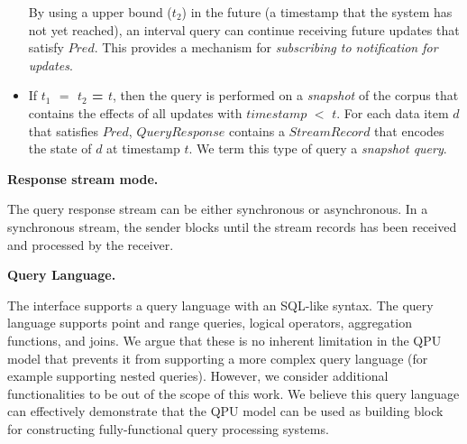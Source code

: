 \begin{itemize}
  By using a upper bound ($t_2$) in the future (a timestamp that the system has not yet reached),
  an interval query can continue receiving future updates that satisfy $Pred$.
  This provides a mechanism for \textit{subscribing to notification for updates}.

  \item If \textbf{$t_1$ $=$ $t_2$ = $t$},
  then the query is performed on a \textit{snapshot} of the corpus that contains the effects of all updates with
  $timestamp$ $<$ $t$.
  For each data item $d$ that satisfies $Pred$, $QueryResponse$ contains a $StreamRecord$ that encodes the state of $d$
  at timestamp $t$.
  We term this type of query a \textit{snapshot query}.

\end{itemize}



\medskip
\noindent
\textbf{Response stream mode.}

\noindent
The query response stream can be either synchronous or asynchronous.
In a synchronous stream, the sender blocks until the stream records has been received and processed by the receiver.

\medskip
\noindent
\textbf{Query Language.}

\noindent
The interface supports a query language with an SQL-like syntax.
The query language supports point and range queries, logical operators, aggregation functions, and joins.
We argue that these is no inherent limitation in the QPU model that prevents it from supporting a more complex
query language (for example supporting nested queries).
However, we consider additional functionalities to be out of the scope of this work.
We believe this query language can effectively demonstrate that the QPU model can be used as building
block for constructing fully-functional query processing systems.

